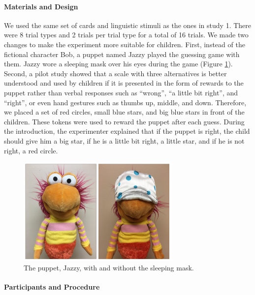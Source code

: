 \documentclass[floatsintext,man]{apa6}
\theoremstyle{definition}
\theoremstyle{definition}
\theoremstyle{definition}
\theoremstyle{remark}
\begin{document}
\paragraph{Materials and Design}\label{materials-and-design-1}

We used the same set of cards and linguistic stimuli as the ones in
study 1. There were 8 trial types and 2 trials per trial type for a
total of 16 trials. We made two changes to make the experiment more
suitable for children. First, instead of the fictional character Bob, a
puppet named Jazzy played the guessing game with them. Jazzy wore a
sleeping mask over his eyes during the game (Figure \ref{fig:jazzy}).
Second, a pilot study showed that a scale with three alternatives is
better understood and used by children if it is presented in the form of
rewards to the puppet rather than verbal responses such as
\enquote{wrong}, \enquote{a little bit right}, and \enquote{right}, or
even hand gestures such as thumbs up, middle, and down. Therefore, we
placed a set of red circles, small blue stars, and big blue stars in
front of the children. These tokens were used to reward the puppet after
each guess. During the introduction, the experimenter explained that if
the puppet is right, the child should give him a big star, if he is a
little bit right, a little star, and if he is not right, a red circle.

\begin{figure}[!h]

{\centering \includegraphics{figs/jazzy-1} 

}

\caption{The puppet, Jazzy, with and without the sleeping mask.}\label{fig:jazzy}
\end{figure}

\paragraph{Participants and
Procedure}\label{participants-and-procedure-1}
\end{document}
